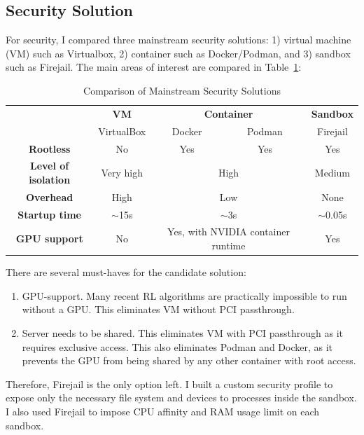 \documentclass[fyp]{socreport}
\begin{document}
\subsection{Security Solution}
For security, I compared three mainstream security solutions: 1) virtual machine (VM) such as Virtualbox, 2) container such as Docker/Podman, and 3) sandbox such as Firejail. The main areas of interest are compared in Table~\ref{tab:security-solutions}:

\begin{table}[H]
\centering
\begin{tabular}{|c|c|cc|c|}
\hline
\multirow{2}{*}{} & \textbf{VM} & \multicolumn{2}{c|}{\textbf{Container}} & \textbf{Sandbox} \\ \cline{2-5} 
 & VirtualBox & \multicolumn{1}{c|}{Docker} & Podman & Firejail \\ \hline
\textbf{Rootless} & No & \multicolumn{1}{c|}{Yes} & Yes & Yes \\ \hline
\textbf{Level of isolation} & Very high & \multicolumn{2}{c|}{High} & Medium \\ \hline
\textbf{Overhead} & High & \multicolumn{2}{c|}{Low} & None \\ \hline
\textbf{Startup time} & $\sim$15s & \multicolumn{2}{c|}{$\sim$3s} & $\sim$0.05s \\ \hline
\textbf{GPU support} & No & \multicolumn{2}{c|}{Yes, with NVIDIA container runtime} & Yes \\ \hline
\end{tabular}
\caption{Comparison of Mainstream Security Solutions}
\label{tab:security-solutions}
\end{table}

There are several must-haves for the candidate solution:

\begin{enumerate}
    \item GPU-support. Many recent RL algorithms are practically impossible to run without a GPU. This eliminates VM without PCI passthrough.
    \item Server needs to be shared. This eliminates VM with PCI passthrough as it requires exclusive access. This also eliminates Podman and Docker, as it prevents the GPU from being shared by any other container with root access.
\end{enumerate}

Therefore, Firejail is the only option left. I built a custom security profile to expose only the necessary file system and devices to processes inside the sandbox. I also used Firejail to impose CPU affinity and RAM usage limit on each sandbox.
\end{document}
